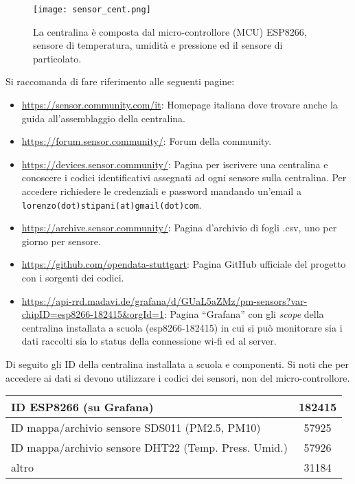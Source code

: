 \documentclass{article}
\begin{document}
\begin{figure}
\centering
\texttt{[image: sensor\_cent.png]}
\label{fig:sensor_cent}
\caption{La centralina è composta dal micro-controllore (MCU) ESP8266, sensore di temperatura, umidità e pressione ed il sensore di particolato.}
\end{figure}

Si raccomanda di fare riferimento alle seguenti pagine:
\begin{itemize}
\item \url{https://sensor.community.com/it}: Homepage italiana dove trovare anche la guida all'assemblaggio della centralina.
\item \url{https://forum.sensor.community/}: Forum della community.
\item \url{https://devices.sensor.community/}: Pagina per iscrivere una centralina e conoscere i codici identificativi assegnati ad ogni sensore sulla centralina. Per accedere richiedere le credenziali e password mandando un'email a \texttt{lorenzo(dot)stipani(at)gmail(dot)com}.
\item \url{https://archive.sensor.community/}: Pagina d'archivio di fogli .csv, uno per giorno per sensore.
\item \url{https://github.com/opendata-stuttgart}: Pagina GitHub ufficiale del progetto con i sorgenti dei codici.
\item \url{https://api-rrd.madavi.de/grafana/d/GUaL5aZMz/pm-sensors?var-chipID=esp8266-182415&orgId=1}: Pagina ``Grafana'' con gli \emph{scope} della centralina installata a scuola (esp8266-182415) in cui si può monitorare sia i dati raccolti sia lo status della connessione wi-fi ed al server.
\end{itemize}

Di seguito gli ID della centralina installata a scuola e componenti. Si noti che per accedere ai dati si devono utilizzare i codici dei sensori, non del micro-controllore.

\begin{center}
\begin{tabular}{|l|c|}
\hline
ID ESP8266 (su Grafana) & 182415\\
\hline
ID mappa/archivio sensore SDS011 (PM2.5, PM10) & 57925\\
\hline
ID mappa/archivio sensore DHT22 (Temp. Press. Umid.) & 57926\\
\hline
altro & 31184\\
\hline
\end{tabular}
\end{center}
\end{document}
